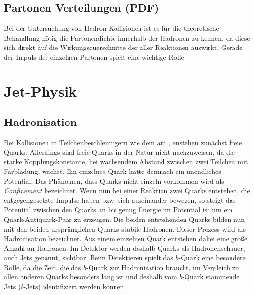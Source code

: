 \subsection{Partonen Verteilungen (PDF)}
Bei der Untersuchung von Hadron-Kollisionen ist es für die theoretische Behandlung nötig die Partonendichte innerhalb der Hadronen zu kennen, da diese sich direkt auf die Wirkungsquerschnitte der aller Reaktionen auswirkt. Gerade der Impuls der einzelnen Partonen spielt eine wichtige Rolle.

\section{Jet-Physik}
\subsection{Hadronisation}
Bei Kollisionen in Teilchenbeschleunigern wie dem \lhc am \cern, enstehen zunächst freie Quarks. Allerdings sind freie Quarks in der Natur nicht nachzuweisen, da die starke Kopplungskonstante, bei wachsendem Abstand zwischen zwei Teilchen mit Farbladung, wächst. Ein einzelnes Quark hätte demnach ein unendliches Potential. Das Phänomen, dass Quarks nicht einzeln vorkommen wird als \emph{Confinement} bezeichnet. Wenn nun bei einer Reaktion zwei Quarks entstehen, die entgegengesetzte Impulse haben bzw. sich auseinander bewegen, so steigt das Potential zwischen den Quarks an bis genug Energie im Potential ist um ein Quark-Antiquark-Paar zu erzeugen. Die beiden entstehenden Quarks bilden nun mit den beiden ursprünglichen Quarks stabile Hadronen. Dieser Prozess wird als Hadronisation bezeichnet. Aus einem einzelnen Quark entstehen dabei eine große Anzahl an Hadronen. Im Detektor werden deshalb Quarks als Hadronenschauer, auch Jets genannt, sichtbar. Beim Detektieren spielt das $b$-Quark eine besondere Rolle, da die Zeit, die das $b$-Quark zur Hadronisation braucht, im Vergleich zu allen anderen Quarks besonders lang ist und deshalb vom $b$-Quark stammende Jets ($b$-Jets) identifiziert werden können.
